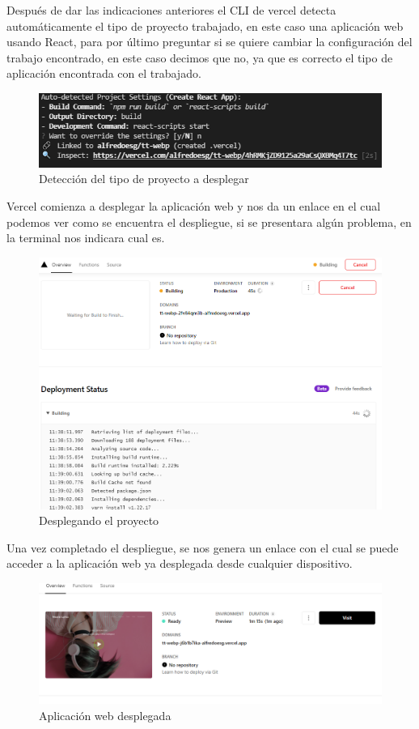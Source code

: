 \documentclass[12pt, a4paper, titlepage]{report}
\begin{document}
Después de dar las indicaciones anteriores el CLI de vercel detecta automáticamente el tipo de proyecto trabajado, en este caso una aplicación web usando React, para por último preguntar si se quiere cambiar la configuración del trabajo encontrado, en este caso decimos que no, ya que es correcto el tipo de aplicación encontrada con el trabajado.
\begin{figure}[H]
	\includegraphics[width=12cm]{./imagenes/Desarrollo/Despliegue/Deteccion.png}
	\centering 
	\caption{Detección del tipo de proyecto a desplegar}
\end{figure}
Vercel comienza a desplegar la aplicación web y nos da un enlace en el cual podemos ver como se encuentra el despliegue, si se presentara algún problema, en la terminal nos indicara cual es.
\begin{figure}[H]
	\includegraphics[width=12cm]{./imagenes/Desarrollo/Despliegue/Desplegando.png}
	\centering 
	\caption{Desplegando el proyecto}
\end{figure}
Una vez completado el despliegue, se nos genera un enlace con el cual se puede acceder a la aplicación web ya desplegada desde cualquier dispositivo.
\begin{figure}[H]
	\includegraphics[width=12cm]{./imagenes/Desarrollo/Despliegue/Desplegada.png}
	\centering 
	\caption{Aplicación web desplegada}
\end{figure}
\end{document}

